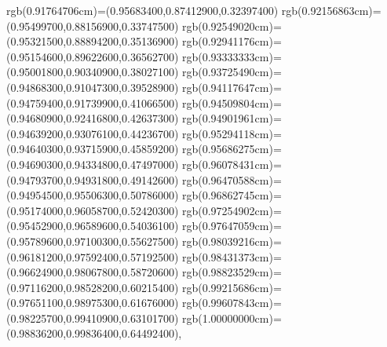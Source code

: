 {{rgb(0.91764706cm)=(0.95683400,0.87412900,0.32397400)
rgb(0.92156863cm)=(0.95499700,0.88156900,0.33747500)
rgb(0.92549020cm)=(0.95321500,0.88894200,0.35136900)
rgb(0.92941176cm)=(0.95154600,0.89622600,0.36562700)
rgb(0.93333333cm)=(0.95001800,0.90340900,0.38027100)
rgb(0.93725490cm)=(0.94868300,0.91047300,0.39528900)
rgb(0.94117647cm)=(0.94759400,0.91739900,0.41066500)
rgb(0.94509804cm)=(0.94680900,0.92416800,0.42637300)
rgb(0.94901961cm)=(0.94639200,0.93076100,0.44236700)
rgb(0.95294118cm)=(0.94640300,0.93715900,0.45859200)
rgb(0.95686275cm)=(0.94690300,0.94334800,0.47497000)
rgb(0.96078431cm)=(0.94793700,0.94931800,0.49142600)
rgb(0.96470588cm)=(0.94954500,0.95506300,0.50786000)
rgb(0.96862745cm)=(0.95174000,0.96058700,0.52420300)
rgb(0.97254902cm)=(0.95452900,0.96589600,0.54036100)
rgb(0.97647059cm)=(0.95789600,0.97100300,0.55627500)
rgb(0.98039216cm)=(0.96181200,0.97592400,0.57192500)
rgb(0.98431373cm)=(0.96624900,0.98067800,0.58720600)
rgb(0.98823529cm)=(0.97116200,0.98528200,0.60215400)
rgb(0.99215686cm)=(0.97651100,0.98975300,0.61676000)
rgb(0.99607843cm)=(0.98225700,0.99410900,0.63101700)
rgb(1.00000000cm)=(0.98836200,0.99836400,0.64492400)},
}
